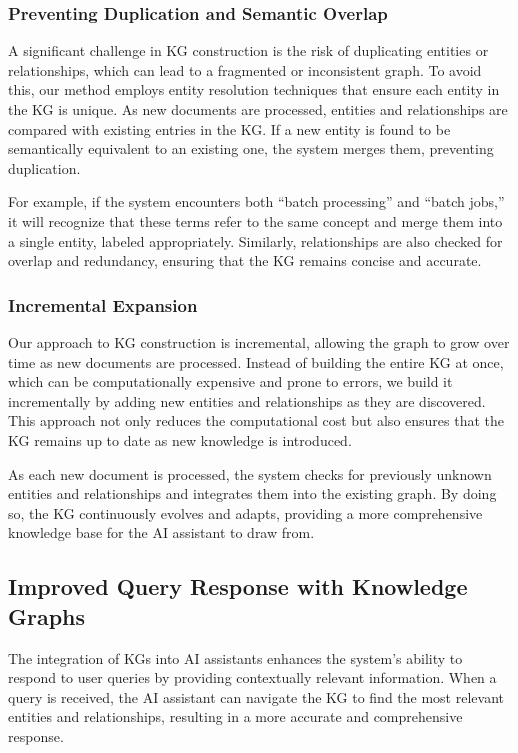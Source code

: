 \subsubsection{Preventing Duplication and Semantic Overlap}

A significant challenge in KG construction is the risk of duplicating entities or relationships, which can lead to a fragmented or inconsistent graph. To avoid this, our method employs entity resolution techniques that ensure each entity in the KG is unique. As new documents are processed, entities and relationships are compared with existing entries in the KG. If a new entity is found to be semantically equivalent to an existing one, the system merges them, preventing duplication.

For example, if the system encounters both “batch processing” and “batch jobs,” it will recognize that these terms refer to the same concept and merge them into a single entity, labeled appropriately. Similarly, relationships are also checked for overlap and redundancy, ensuring that the KG remains concise and accurate.

\subsubsection{Incremental Expansion}

Our approach to KG construction is incremental, allowing the graph to grow over time as new documents are processed. Instead of building the entire KG at once, which can be computationally expensive and prone to errors, we build it incrementally by adding new entities and relationships as they are discovered. This approach not only reduces the computational cost but also ensures that the KG remains up to date as new knowledge is introduced.

As each new document is processed, the system checks for previously unknown entities and relationships and integrates them into the existing graph. By doing so, the KG continuously evolves and adapts, providing a more comprehensive knowledge base for the AI assistant to draw from.

\subsection{Improved Query Response with Knowledge Graphs}

The integration of KGs into AI assistants enhances the system’s ability to respond to user queries by providing contextually relevant information. When a query is received, the AI assistant can navigate the KG to find the most relevant entities and relationships, resulting in a more accurate and comprehensive response.

